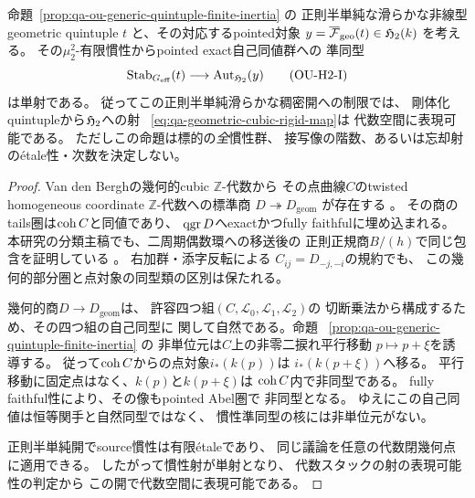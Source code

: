 \begin{proposition}
\label{prop:qa-ou-generic-inertia-faithful-to-h2}
命題~\ref{prop:qa-ou-generic-quintuple-finite-inertia} の
正則半単純な滑らかな非線型geometric quintuple
$t$ と、その対応するpointed対象
$y=\overline{\mathcal F}_{\mathrm{geo}}(t)\in\mathfrak H_2(k)$
を考える。
その$\mu_2^2$-有限慣性からpointed exact自己同値群への
準同型
\[
 \operatorname{Stab}_{G_{\mathrm{eff}}}(t)
       \longrightarrow\operatorname{Aut}_{\mathfrak H_2}(y)
 \tag{OU-H2-I}\label{eq:qa-ou-h2-generic-inertia-injection}
\]
は単射である。
従ってこの正則半単純滑らかな稠密開への制限では、
剛体化quintupleから$\mathfrak H_2$への射
~\eqref{eq:qa-geometric-cubic-rigid-map}は
代数空間に表現可能である。
ただしこの命題は標的の\emph{全}慣性群、
接写像の階数、あるいは忘却射のétale性・次数を決定しない。
\end{proposition}
\begin{proof}
Van den Berghの幾何的cubic $\mathbb Z$-代数から
その点曲線$C$のtwisted homogeneous coordinate
$\mathbb Z$-代数への標準商
$D\twoheadrightarrow D_{\mathrm{geom}}$ が存在する
\cite[Theorem 5.5.6]{VdB2011}。
その商のtails圏は$\operatorname{coh} C$と同値であり、
$\operatorname{qgr} D$へexactかつfully faithfulに埋め込まれる。
本研究の分類主稿でも、二周期偶数環への移送後の
正則正規商$B/(h)$で同じ包含を証明している
\cite{QuadricIntrinsic2026}。
右加群・添字反転による
$C_{ij}=D_{-j,-i}$の規約でも、
この幾何的部分圏と点対象の同型類の区別は保たれる。

幾何的商$D\to D_{\mathrm{geom}}$は、
許容四つ組$(C,\mathcal L_0,\mathcal L_1,\mathcal L_2)$の
切断乗法から構成するため、その四つ組の自己同型に
関して自然である。命題
~\ref{prop:qa-ou-generic-quintuple-finite-inertia} の
非単位元は$C$上の非零二捩れ平行移動
$p\mapsto p+\xi$を誘導する。
従って$\operatorname{coh} C$からの点対象$i_*(k(p))$は
$i_*(k(p+\xi))$へ移る。
平行移動に固定点はなく、$k(p)$と$k(p+\xi)$は
$\operatorname{coh} C$内で非同型である。
fully faithful性により、その像もpointed Abel圏で
非同型となる。
ゆえにこの自己同値は恒等関手と自然同型ではなく、
慣性準同型の核には非単位元がない。

正則半単純開でsource慣性は有限étaleであり、
同じ議論を任意の代数閉幾何点に適用できる。
したがって慣性射が単射となり、
代数スタックの射の表現可能性の判定から
この開で代数空間に表現可能である。
\end{proof}

